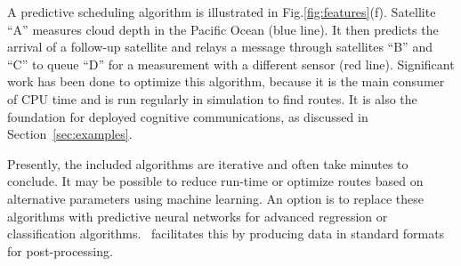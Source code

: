 \documentclass[conference]{IEEEtran}
\newcommand{\project}{{\sc{Collaborate}}~}
\begin{document}
A predictive scheduling algorithm is illustrated in Fig.\ref{fig:features}(f).  Satellite ``A'' measures cloud depth in the Pacific Ocean (blue line).  It then predicts the arrival of a follow-up satellite and relays a message through satellites ``B'' and ``C'' to queue ``D'' for a measurement with a different sensor (red line).  Significant work has been done to optimize this algorithm, because it is the main consumer of CPU time and is run regularly in simulation to find routes.  It is also the foundation for deployed cognitive communications, as discussed in Section~\ref{sec:examples}.

Presently, the included algorithms are iterative and often take minutes to conclude.  It may be possible to reduce run-time or optimize routes based on alternative parameters using machine learning.  An option is to replace these algorithms with predictive neural networks for advanced regression or classification algorithms.  \project facilitates this by producing data in standard formats for post-processing.
\end{document}

